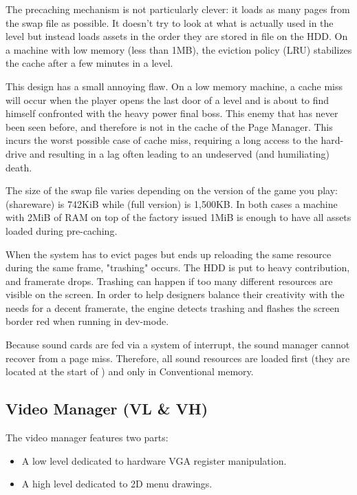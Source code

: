 \documentclass[book.tex]{subfiles}
\begin{document}
 \par
The precaching mechanism is not particularly clever: it loads as many pages from the swap file as possible. It doesn't try to look at what is actually used in the level but instead loads assets in the order they are stored in  file on the HDD. On a machine with low memory (less than 1MB), the eviction policy (LRU) stabilizes the cache after a few minutes in a level.\\
\par
This design has a small annoying flaw. On a low memory machine, a cache miss will occur when the player opens the last door of a level and is about to find himself confronted with the heavy power final boss. This enemy that has never been seen before, and therefore is not in the cache of the Page Manager. This incurs the worst possible case of cache miss, requiring a long access to the hard-drive and resulting in a lag often leading to an undeserved (and humiliating) death.\\
\par
The size of the swap file varies depending on the version of the game you play:  (shareware) is 742KiB while  (full version) is 1,500KB. In both cases a machine with 2MiB of RAM on top of the factory issued 1MiB is enough to have all assets loaded during pre-caching.\\
\par
{} When the system has to evict pages but ends up reloading the same resource during the same frame, "trashing" occurs. The HDD is put to heavy contribution, and framerate drops. Trashing can happen if too many different resources are visible on the screen. In order to help designers balance their creativity with the needs for a decent framerate, the engine detects trashing and flashes the screen border red when running in dev-mode.\\
\par
{} Because sound cards are fed via a system of interrupt, the sound manager cannot recover from a page miss. Therefore, all sound resources are loaded first (they are located at the start of ) and only in Conventional memory.











\subsection{Video Manager (VL \& VH)}
The video manager features two parts:
\begin{itemize}
\item A low level dedicated to hardware VGA register manipulation.
\item A high level dedicated to 2D menu drawings.
\end{itemize}
\par
\end{document}
